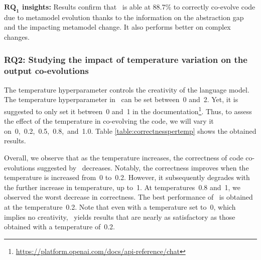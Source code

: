 \begin{tcolorbox}[boxsep=-2pt]
	\textbf{$\boldsymbol{RQ_1}$ insights:}
	Results confirm that \LLM~is able at 88.7\% to correctly co-evolve code due to metamodel evolution thanks to the information on the abstraction gap and the impacting metamodel change. It also performs better on complex changes.  
\end{tcolorbox}


\subsubsection{RQ2: Studying the impact of temperature variation on the output co-evolutions}

The temperature hyperparameter controls the creativity of the language model. The temperature hyperparameter in \LLM~can be set between~0 and~2. Yet, it is suggested to only set it between~0 and~1 in the documentation\footnote{\url{https://platform.openai.com/docs/api-reference/chat}}. Thus, to assess the effect of the temperature in co-evolving the code, we will vary it on~0,~0.2,~0.5,~0.8,~and~1.0. 
Table \ref{table:correctnesspertemp} shows the obtained results. 


Overall, we observe that as the temperature increases, the correctness of code co-evolutions suggested by \LLM~decreases. Notably, the correctness improves when the temperature is increased from~0 to~0.2. However, it subsequently degrades with the further increase in temperature, up to~1. At temperatures~0.8 and~1, we observed the worst decrease in correctness. %
The best performance of \LLM~is obtained at the temperature~0.2. Note that even with a temperature set to~0, which implies no creativity, \LLM~yields results that are nearly as satisfactory as those obtained with a temperature of~0.2.

